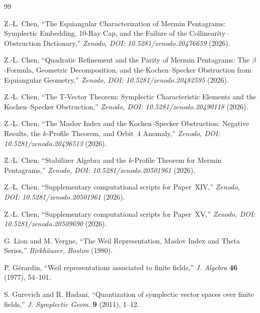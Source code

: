 \documentclass[11pt,a4paper]{article}
\theoremstyle{remark}
\begin{document}
\begin{thebibliography}{99}

Z.-L. Chen,
``The Equiangular Characterization of Mermin Pentagrams:
Symplectic Embedding, 10-Ray Cap, and the Failure of the
Collinearity--Obstruction Dictionary,''
\textit{Zenodo, DOI: 10.5281/zenodo.20476659} (2026).

Z.-L. Chen,
``Quadratic Refinement and the Parity of Mermin Pentagrams:
The $\beta$-Formula, Geometric Decomposition, and the
Kochen--Specker Obstruction from Equiangular Geometry,''
\textit{Zenodo, DOI: 10.5281/zenodo.20482595} (2026).

Z.-L. Chen,
``The T-Vector Theorem: Symplectic Characteristic Elements
and the Kochen--Specker Obstruction,''
\textit{Zenodo, DOI: 10.5281/zenodo.20490118} (2026).

Z.-L. Chen,
``The Maslov Index and the Kochen--Specker Obstruction:
Negative Results, the $k$-Profile Theorem, and Orbit~4 Anomaly,''
\textit{Zenodo, DOI: 10.5281/zenodo.20496513} (2026).

Z.-L. Chen,
``Stabilizer Algebra and the $k$-Profile Theorem for Mermin Pentagrams,''
\textit{Zenodo, DOI: 10.5281/zenodo.20501961} (2026).

Z.-L. Chen,
``Supplementary computational scripts for Paper~XIV,''
\textit{Zenodo, DOI: 10.5281/zenodo.20501961} (2026).

Z.-L. Chen,
``Supplementary computational scripts for Paper~XV,''
\textit{Zenodo, DOI: 10.5281/zenodo.20509690} (2026).

G. Lion and M. Vergne,
``The Weil Representation, Maslov Index and Theta Series,''
\textit{Birkh\"auser, Boston} (1980).

P. G\'erardin,
``Weil representations associated to finite fields,''
\textit{J. Algebra} \textbf{46} (1977), 54--101.

S. Gurevich and R. Hadani,
``Quantization of symplectic vector spaces over finite fields,''
\textit{J. Symplectic Geom.} \textbf{9} (2011), 1--12.

\end{thebibliography}
\end{document}
